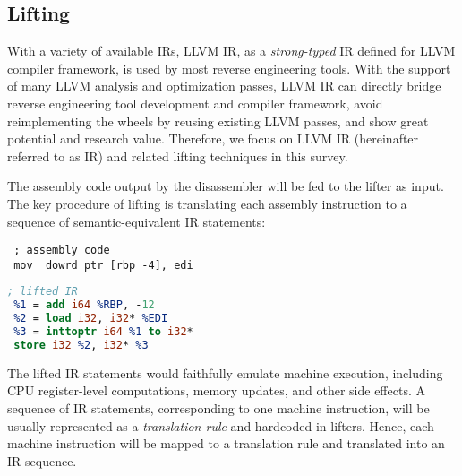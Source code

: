 \subsection{Lifting} \label{sec:background-lifting}

With a variety of available IRs, LLVM IR, as a \textit{strong-typed} IR defined for LLVM compiler framework, is used by most reverse engineering tools. With the support of many LLVM analysis and optimization passes, LLVM IR can directly bridge reverse engineering tool development and compiler framework, avoid reimplementing the wheels by reusing existing LLVM passes, and show great potential and research value. Therefore, we focus on LLVM IR (hereinafter referred to as IR) and related lifting techniques in this survey.

The assembly code output by the disassembler will be fed to the lifter as input. The key procedure of lifting is translating each assembly instruction to a sequence of semantic-equivalent IR statements:

\vspace*{3pt}
\noindent\hspace*{36pt}\begin{minipage}{.40\linewidth}
\begin{lstlisting}
 ; assembly code
 mov  dowrd ptr [rbp -4], edi
\end{lstlisting}
\end{minipage}\hspace*{24pt}
\begin{minipage}{.40\linewidth}
\begin{lstlisting}[language=llvm]
 ; lifted IR
 %1 = add i64 %RBP, -12
 %2 = load i32, i32* %EDI
 %3 = inttoptr i64 %1 to i32*
 store i32 %2, i32* %3
\end{lstlisting}
\end{minipage}

The lifted IR statements would faithfully emulate machine execution, including CPU register-level computations, memory updates, and other side effects. A sequence of IR statements, corresponding to one machine instruction, will be usually represented as a \textit{translation rule} and hardcoded in lifters. Hence, each machine instruction will be mapped to a translation rule and translated into an IR sequence.

